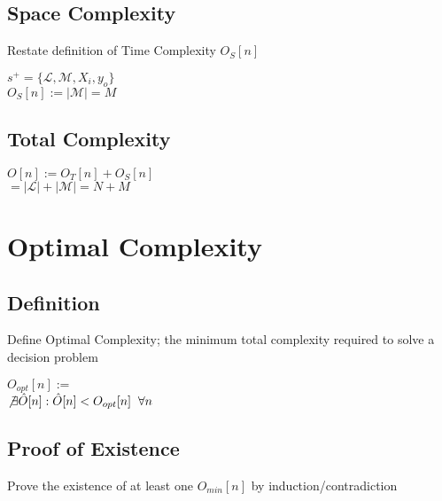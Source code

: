 \documentclass[11pt]{article}
\begin{document}
\subsection{Space Complexity}
Restate definition of Time Complexity $O_S[n]$
\begin{center}
$
s^+ = \{ \mathcal{L},\mathcal{M},X_i,y_o\}
$
\\ \vspace{2mm}
$
O_S[n] := |\mathcal{M}| = M
$
\end{center}





\subsection{Total Complexity}
\begin{center}
$O[n] := O_T[n] + O_S[n]$
\\ \vspace{2mm}
$= |\mathcal{L}| + |\mathcal{M}| = N + M$
\end{center}












\newpage
\section{Optimal Complexity}

\subsection{Definition}
Define Optimal Complexity; the minimum total complexity required to solve a decision problem
\begin{center}
$O_{opt}[n] :=$
\\ \vspace{2mm}
$\not \exists \hat{O} \lbrack n \rbrack : \hat{O} \lbrack n \rbrack < O_{opt}[n] \hspace{2mm} \forall n$
\end{center}

\subsection{Proof of Existence}
Prove the existence of at least one $O_{min}[n]$ by induction/contradiction
\end{document}
